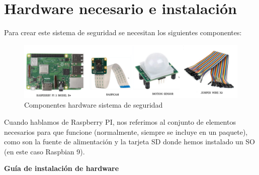 \section{Hardware necesario e instalación}

Para crear este sistema de seguridad se necesitan los siguientes componentes:

\begin{figure}[h]
	\centering
	\includegraphics[scale=0.35]{images/44}
	\caption{Componentes hardware sistema de seguridad}
\end{figure}

Cuando hablamos de Raspberry PI, nos referimos al conjunto de elementos necesarios para que funcione (normalmente, siempre se incluye en un paquete), como son la fuente de alimentación y la tarjeta SD donde hemos instalado un SO (en este caso Raspbian 9).

\textbf{Guía de instalación de hardware}

